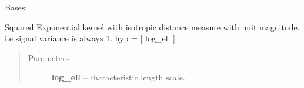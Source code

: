 \documentclass[letterpaper,10pt,english]{sphinxmanual}
\begin{document}
\begin{fulllineitems}
\label{pyGPs.Core:pyGPs.Core.cov.RBFunit}
Bases: {\hyperref[pyGPs.Core:pyGPs.Core.cov.Kernel]{}}

Squared Exponential kernel with isotropic distance measure with unit magnitude.
i.e signal variance is always 1. hyp = {[} log\_ell {]}
\begin{quote}\begin{description}
\item[{Parameters}] \leavevmode
\textbf{log\_ell} -- characteristic length scale.

\end{description}\end{quote}

\begin{fulllineitems}
\label{pyGPs.Core:pyGPs.Core.cov.RBFunit.getCovMatrix}
\end{fulllineitems}


\begin{fulllineitems}
\label{pyGPs.Core:pyGPs.Core.cov.RBFunit.getDerMatrix}
\end{fulllineitems}


\end{fulllineitems}

\end{document}
